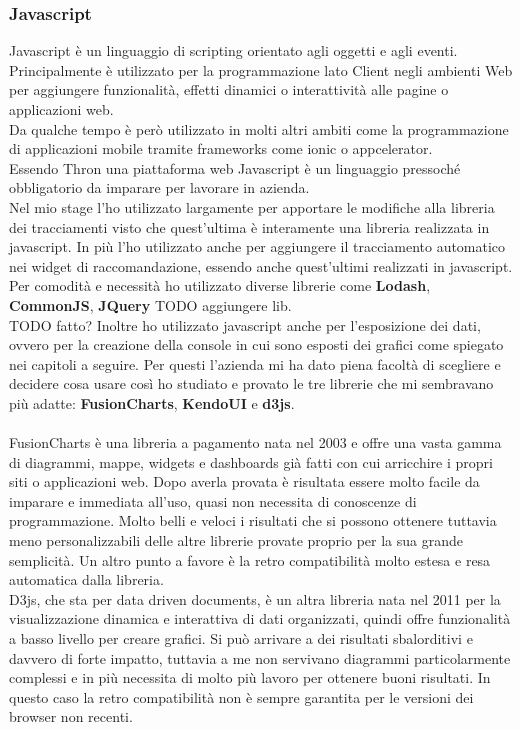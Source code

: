 \documentclass[a4paper, 12pt, twoside, openright]{book}
\begin{document}
\subsubsection{Javascript}
Javascript è un linguaggio di scripting orientato agli oggetti e agli eventi. Principalmente è utilizzato per la programmazione lato Client negli ambienti Web per aggiungere funzionalità, effetti dinamici o interattività alle pagine o applicazioni web.\\
Da qualche tempo è però utilizzato in molti altri ambiti come la programmazione di applicazioni mobile tramite frameworks come ionic o appcelerator.\\
Essendo Thron una piattaforma web Javascript è un linguaggio pressoché obbligatorio da imparare per lavorare in azienda.\\
Nel mio stage l'ho utilizzato largamente per apportare le modifiche alla libreria dei tracciamenti visto che quest'ultima è interamente una libreria realizzata in javascript. In più l'ho utilizzato anche per aggiungere il tracciamento automatico nei widget di raccomandazione, essendo anche quest'ultimi realizzati in javascript.\\
Per comodità e necessità ho utilizzato diverse librerie come \textbf{Lodash}, \textbf{CommonJS}, \textbf{JQuery} TODO aggiungere lib.\\
TODO fatto? Inoltre ho utilizzato javascript anche per l'esposizione dei dati, ovvero per la creazione della console in cui sono esposti dei grafici come spiegato nei capitoli a seguire. Per questi l'azienda mi ha dato piena facoltà di scegliere e decidere cosa usare così ho studiato e provato le tre librerie che mi sembravano più adatte: \textbf{FusionCharts}, \textbf{KendoUI} e \textbf{d3js}.\\ \\
FusionCharts è una libreria a pagamento nata nel 2003 e offre una vasta gamma di diagrammi, mappe, widgets e dashboards già fatti con cui arricchire i propri siti o applicazioni web. Dopo averla provata è risultata essere molto facile da imparare e immediata all'uso, quasi non necessita di conoscenze di programmazione. Molto belli e veloci i risultati che si possono ottenere tuttavia meno personalizzabili delle altre librerie provate proprio per la sua grande semplicità. Un altro punto a favore è la retro compatibilità molto estesa e resa automatica dalla libreria.\\
D3js, che sta per data driven documents, è un altra libreria nata nel 2011 per la visualizzazione dinamica e interattiva di dati organizzati, quindi offre funzionalità a basso livello per creare grafici. Si può arrivare a dei risultati sbalorditivi e davvero di forte impatto, tuttavia a me non servivano diagrammi particolarmente complessi e in più necessita di molto più lavoro per ottenere buoni risultati. In questo caso la retro compatibilità non è sempre garantita per le versioni dei browser non recenti.\\
\end{document}
